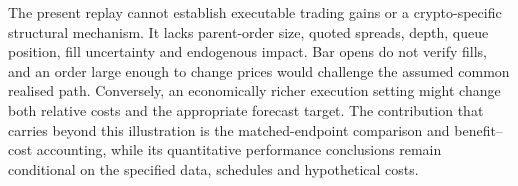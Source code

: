 The present replay cannot establish executable trading gains or a crypto-specific structural mechanism. It lacks parent-order size, quoted spreads, depth, queue position, fill uncertainty and endogenous impact. Bar opens do not verify fills, and an order large enough to change prices would challenge the assumed common realised path. Conversely, an economically richer execution setting might change both relative costs and the appropriate forecast target. The contribution that carries beyond this illustration is the matched-endpoint comparison and benefit--cost accounting, while its quantitative performance conclusions remain conditional on the specified data, schedules and hypothetical costs.
